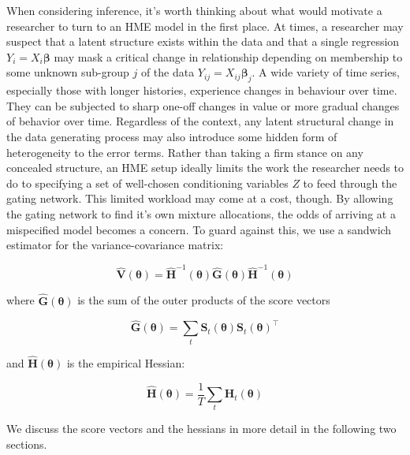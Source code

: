 \documentclass[12pt]{article}
\newcommand{\Ht}[1]{\mathbf{H}_{t}(#1)}
\newcommand{\HH}[1]{\boldsymbol{\hat{H}}(#1)}
\newcommand{\HI}[1]{\boldsymbol{\hat{H}}^{-1}(#1)}
\begin{document}
When considering inference, it's worth thinking about what would motivate
a researcher to turn to an HME model in the first place. At times,
a researcher may suspect that a latent structure exists within the data
and that a single regression $Y_{i} = X_{i} \boldsymbol{\beta}$
may mask a critical change in relationship depending on membership to
some unknown sub-group $j$ of the data $Y_{ij} = X_{ij} \boldsymbol{\beta}_{j}$.
A wide variety of time series, especially those with longer histories,
experience changes in behaviour over time. They can be subjected to sharp one-off
changes in value or more gradual changes of behavior over time. Regardless of
the context, any latent structural change in the data generating
process may also introduce some hidden form of heterogeneity to the error terms. 
Rather than taking a firm stance on any concealed structure, an HME
setup ideally limits the work the researcher needs to do to specifying
a set of well-chosen conditioning variables $Z$ to feed through the gating
network. This limited workload may come at a cost, though. By allowing the 
gating network to find it's own mixture allocations, the odds of arriving at a
mispecified model becomes a concern. To guard against this, we use a sandwich
estimator for the variance-covariance matrix:

\begin{equation} \label{eq:robustgatevarcov}
  \boldsymbol{\hat{V}}(\boldsymbol{\theta}) = \HI{\boldsymbol{\theta}} \boldsymbol{\hat{G}}(\boldsymbol{\theta}) \HI{\boldsymbol{\theta}}
\end{equation}



where $\boldsymbol{\hat{G}}(\boldsymbol{\theta})$ is the sum of the outer products of the score 
vectors

\begin{equation}
  \boldsymbol{\hat{G}}(\boldsymbol{\theta}) = \sum_{t} \boldsymbol{S}_{t}(\boldsymbol{\theta}) \boldsymbol{S}_{t}(\boldsymbol{\theta})^\top
\end{equation}

and $\HH{\boldsymbol{\theta}}$ is the empirical Hessian:

\begin{equation}
  \HH{\boldsymbol{\theta}} = \frac{1}{T} \sum_{t} \Ht{\boldsymbol{\theta}}
\end{equation}

We discuss the score vectors and the hessians in more detail in the following
two sections.
\end{document}
